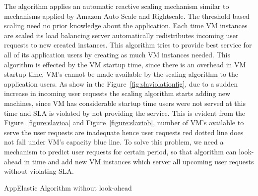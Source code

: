 The algorithm applies an automatic reactive scaling mechanism similar to mechanisms applied by Amazon Auto Scale and Rightscale\cite{han2012lightweight}. The threshold based scaling need no prior knowledge about the application. Each time VM instances are scaled its load balancing server automatically redistributes incoming user requests to new created instances\cite{han2012lightweight}. This algorithm tries to provide best service for all of its application users by creating as much VM instances needed. This algorithm is effected by the VM startup time, since there is an overhead in VM startup time, VM's cannot be made available by the scaling algorithm to the application users. As show in the Figure~\ref{fig:slaviolationfig}, due to a sudden increase in incoming user requests the scaling algorithm starts adding new machines, since VM has considerable startup time users were not served at this time and SLA is violated by not providing the service. This is evident from the Figure~\ref{figure:slavioa} and Figure~\ref{figure:slaviob}, number of VM's available to serve the user requests are inadequate hence user requests red dotted line does not fall under VM's capacity blue line. To solve this problem, we need a mechanism to predict user requests for certain period, so that algorithm can look-ahead in time and add new VM instances which server all upcoming user requests without violating SLA.

\LinesNumbered
\begin{algorithm}[H]
 \caption{AppElastic Algorithm without look-ahead}
 \label{algo:appelasticwithoutlookahead}
\end{algorithm}

